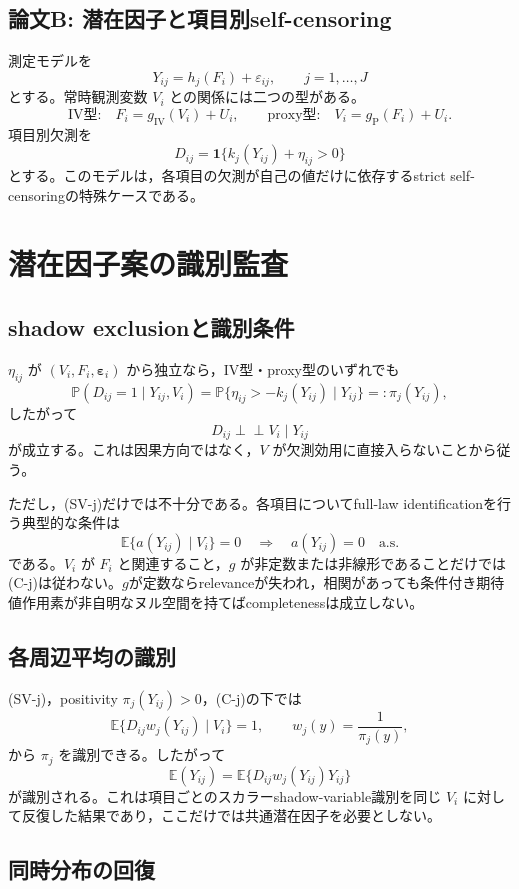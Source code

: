 \documentclass[a4paper,11pt,xelatex,ja=standard]{bxjsarticle}
\newcommand{\indep}{\mathrel{\perp\!\!\!\perp}}
\newcommand{\E}{\mathbb E}
\newcommand{\Prb}{\mathbb P}
\begin{document}
\subsection{論文B: 潜在因子と項目別self-censoring}

測定モデルを
\[
Y_{ij}=h_j(F_i)+\varepsilon_{ij},\qquad j=1,\ldots,J
\]
とする。常時観測変数 $V_i$ との関係には二つの型がある。
\[
\text{IV型:}\quad F_i=g_{\mathrm{IV}}(V_i)+U_i,
\qquad
\text{proxy型:}\quad V_i=g_{\mathrm P}(F_i)+U_i.
\]
項目別欠測を
\[
D_{ij}=\mathbf 1\{k_j(Y_{ij})+\eta_{ij}>0\}
\]
とする。このモデルは，各項目の欠測が自己の値だけに依存するstrict self-censoringの特殊ケースである。

\section{潜在因子案の識別監査}

\subsection{shadow exclusionと識別条件}

$\eta_{ij}$ が $(V_i,F_i,\bm\varepsilon_i)$ から独立なら，IV型・proxy型のいずれでも
\[
\Prb(D_{ij}=1\mid Y_{ij},V_i)
=\Prb\{\eta_{ij}>-k_j(Y_{ij})\mid Y_{ij}\}
=:\pi_j(Y_{ij}),
\]
したがって
\[
D_{ij}\indep V_i\mid Y_{ij}
\tag{SV-j}
\]
が成立する。これは因果方向ではなく，$V$ が欠測効用に直接入らないことから従う。

ただし，(SV-j)だけでは不十分である。各項目についてfull-law identificationを行う典型的な条件は
\[
\E\{a(Y_{ij})\mid V_i\}=0
\quad\Longrightarrow\quad
a(Y_{ij})=0\quad\text{a.s.}
\tag{C-j}
\]
である。$V_i$ が $F_i$ と関連すること，$g$ が非定数または非線形であることだけでは(C-j)は従わない。$g$が定数ならrelevanceが失われ，相関があっても条件付き期待値作用素が非自明なヌル空間を持てばcompletenessは成立しない。

\subsection{各周辺平均の識別}

(SV-j)，positivity $\pi_j(Y_{ij})>0$，(C-j)の下では
\[
\E\{D_{ij}w_j(Y_{ij})\mid V_i\}=1,
\qquad
w_j(y)=\frac{1}{\pi_j(y)},
\]
から $\pi_j$ を識別できる。したがって
\[
\E(Y_{ij})=\E\{D_{ij}w_j(Y_{ij})Y_{ij}\}
\]
が識別される。これは項目ごとのスカラーshadow-variable識別を同じ $V_i$ に対して反復した結果であり，ここだけでは共通潜在因子を必要としない。

\subsection{同時分布の回復}
\end{document}
